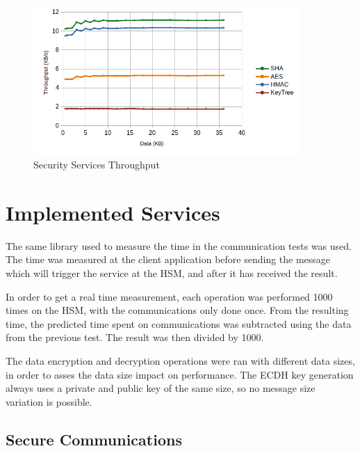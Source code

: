 \begin{figure}[h!]
	\centering
	\includegraphics[width=0.9\textwidth]{./Images/core-tput.png}
	\caption{Security Services Throughput}
	\label{fig:performance:cores:tput}
\end{figure}
\section{Implemented Services}\label{chap:evaluation:services}

The same library used to measure the time in the communication tests was used.
The time was measured at the client application before sending the message which will trigger the service at the HSM, and after it has received the result.

In order to get a real time measurement, each operation was performed 1000 times on the HSM, with the communications only done once.
From the resulting time, the predicted time spent on communications was subtracted using the data from the previous test. The result was then divided by 1000.

The data encryption and decryption operations were ran with different data sizes, in order to asses the data size impact on performance.
The ECDH key generation always uses a private and public key of the same size, so no message size variation is possible.

\subsection{Secure Communications}\label{chap:evaluation:services:comms}

